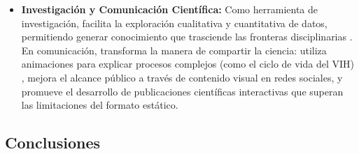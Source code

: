 \documentclass[12pt,a4paper]{article}
\begin{document}
\begin{itemize}
    \item \textbf{Investigación y Comunicación Científica:} Como herramienta de investigación, facilita la exploración cualitativa y cuantitativa de datos, permitiendo generar conocimiento que trasciende las fronteras disciplinarias \cite{Moorhead2006}. En comunicación, transforma la manera de compartir la ciencia: utiliza animaciones para explicar procesos complejos (como el ciclo de vida del VIH) \cite{nayak2019}, mejora el alcance público a través de contenido visual en redes sociales, y promueve el desarrollo de publicaciones científicas interactivas que superan las limitaciones del formato estático.

\end{itemize}


\subsection*{Conclusiones}




\end{document}
